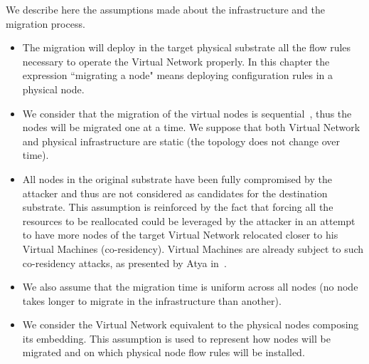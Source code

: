 \label{sec:mdp-system-hypotheses}
We describe here the assumptions made about the infrastructure and the migration process.

\begin{itemize}
    \item
    The migration will deploy in the target physical substrate all the flow rules necessary to operate the Virtual Network properly. In this chapter the expression ``migrating a node" means deploying configuration rules in a physical node.
    
    \item
    We consider that the migration of the virtual nodes is sequential~\cite{Lime-Ghorbani2014}, thus the nodes will be migrated one at a time.
    We suppose that both Virtual Network and physical infrastructure are static (\ie the topology does not change over time).
    
    \item All nodes in the original substrate have been fully compromised by the attacker and thus are not considered as candidates for the destination substrate.  
    This assumption is reinforced by the fact that forcing all the resources to be reallocated could be leveraged by the attacker in an attempt to have more nodes of the target Virtual Network relocated closer to his Virtual Machines (\ie co-residency).
    Virtual Machines are already subject to such co-residency attacks, as presented by Atya \etal in~\cite{stalling-atya2017,malicious-atya2017}.

    \item
    We also assume that the migration time is uniform across all nodes (\ie no node takes longer to migrate in the infrastructure than another).
    
    \item
     We consider the Virtual Network equivalent to the physical nodes composing its embedding.
     This assumption is used to represent how nodes will be migrated and on which physical node flow rules will be installed. 
\end{itemize}

